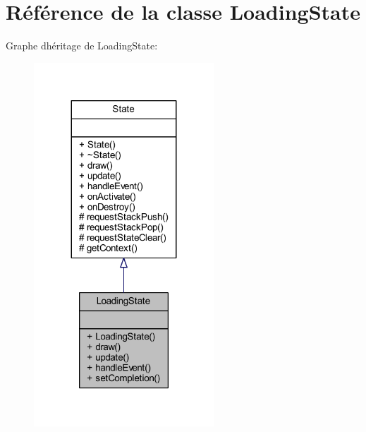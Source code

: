 \hypertarget{class_loading_state}{}\section{Référence de la classe Loading\+State}
\label{class_loading_state}


Graphe d\textquotesingle{}héritage de Loading\+State\+:\nopagebreak
\begin{figure}[H]
\begin{center}
\leavevmode
\includegraphics[width=191pt]{class_loading_state__inherit__graph}
\end{center}
\end{figure}



